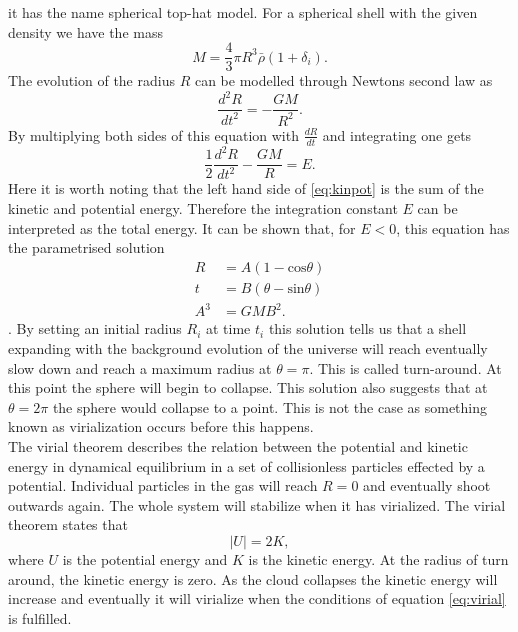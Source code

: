 it has the name spherical top-hat model. For a spherical shell with the given
density we have the mass
\begin{equation}
    M=\frac{4}{3}\pi R^3\bar{\rho}(1+\delta_i).
\end{equation}
The evolution of the radius $R$ can be modelled through Newtons second law as
\begin{equation}
    \frac{d^2R}{dt^2}=-\frac{GM}{R^2}.
\end{equation}
By multiplying both sides of this equation with $\frac{dR}{dt}$ and integrating
one gets
\begin{equation}\label{eq:kinpot}
    \frac{1}{2}\frac{d^2R}{dt^2}-\frac{GM}{R}=E.
\end{equation}
Here it is worth noting that the left hand side of \ref{eq:kinpot} is the sum of
the kinetic and potential energy. Therefore the integration constant $E$ can be
interpreted as the total energy. It can be shown that, for
$E<0$, this equation has the parametrised solution
\begin{align}
    R&=A(1-\mathrm{cos}\theta)\\
    t&=B(\theta-\mathrm{sin}\theta)\\
    A^3&=GMB^2.
\end{align}
\cite[p.~79]{peebles1980}. By setting an initial radius $R_i$ at time $t_i$ this
solution tells us that a shell expanding with the background evolution of the
universe will reach eventually slow down and reach a maximum radius at
$\theta=\pi$. This is called turn-around. At this point the sphere will begin to
collapse. This solution also suggests that at $\theta=2\pi$ the sphere would
collapse to a point. This is not the case as something known as virialization
occurs before this happens.\\\indent
The virial theorem describes the relation between the potential and kinetic
energy in dynamical equilibrium in a set of collisionless particles effected by
a potential. Individual particles in the gas will reach $R=0$ and eventually
shoot outwards again. The whole system will stabilize when it has virialized. The virial theorem states that
\begin{equation}\label{eq:virial}
    \vert U\vert=2K,
\end{equation}
where $U$ is the potential energy and $K$ is the kinetic energy.
At the radius of turn around, the kinetic energy is zero. As the cloud collapses
the kinetic energy will increase and eventually it will virialize when the
conditions of equation \ref{eq:virial} is fulfilled.
